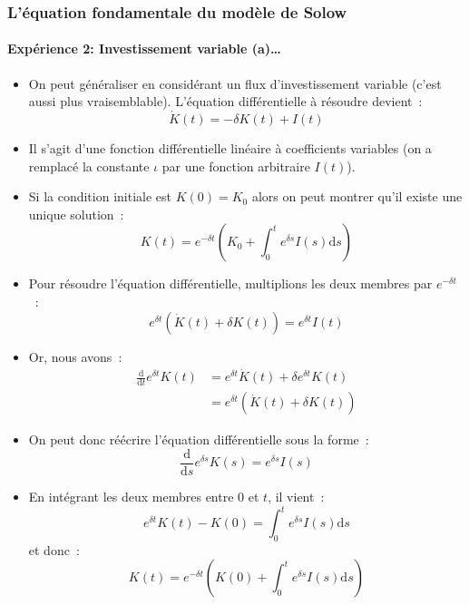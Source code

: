 \documentclass[10pt,notheorems]{beamer}
\theoremstyle{plain}
\theoremstyle{definition} %
\newenvironment{notes}
{\bgroup \justifying\bgroup\tiny\begin{spacing}{1.0}}
  {\end{spacing}\egroup\egroup}
\begin{document}
\begin{frame}
  \frametitle{L'équation fondamentale du modèle de Solow}
  \framesubtitle{Expérience 2: Investissement variable (a)\ldots}

  \begin{itemize}
  \item On peut généraliser en considérant un flux d'investissement variable (c'est aussi plus vraisemblable). L'équation différentielle à résoudre devient~:
    \[
      \dot K(t) = -\delta K(t) + I(t)
    \]

    \bigskip

  \item Il s'agit d'une fonction différentielle linéaire à coefficients variables (on a remplacé la constante $\iota$ par une fonction arbitraire $I(t)$).\newline


  \item Si la condition initiale est $K(0)=K_0$ alors on peut montrer qu'il existe une unique solution~:
    \[
      K(t) = e^{-\delta t}\left(K_0 + \int_0^te^{\delta s}I(s)\mathrm ds\right)
    \]
  \end{itemize}

\end{frame}


\begin{notes}
  \begin{itemize}

  \item Pour résoudre l'équation différentielle, multiplions les deux membres par $e^{-\delta t}$~:
    \[
      e^{\delta t}\left(\dot K(t)+\delta K(t)\right) = e^{\delta t} I(t)
    \]

  \item Or, nous avons~:
    \[
      \begin{split}
        \frac{\mathrm d}{\mathrm dt} e^{\delta t} K(t) &= e^{\delta t} \dot K(t) + \delta e^{\delta t}K(t)\\
        &= e^{\delta t}\left(\dot K(t)+\delta K(t)\right)
      \end{split}
    \]

  \item On peut donc réécrire l'équation différentielle sous la forme~:
    \[
      \frac{\mathrm d}{\mathrm ds} e^{\delta s} K(s) = e^{\delta s} I(s)
    \]

  \item En intégrant les deux membres entre 0 et $t$, il vient~:
    \[
      e^{\delta t}K(t) - K(0) = \int_0^te^{\delta s} I(s)\mathrm ds
    \]
    et donc~:
    \[
      K(t) = e^{-\delta t}\left(K(0) + \int_0^te^{\delta s} I(s)\mathrm ds\right)
    \]

  \end{itemize}

\end{notes}
\end{document}
